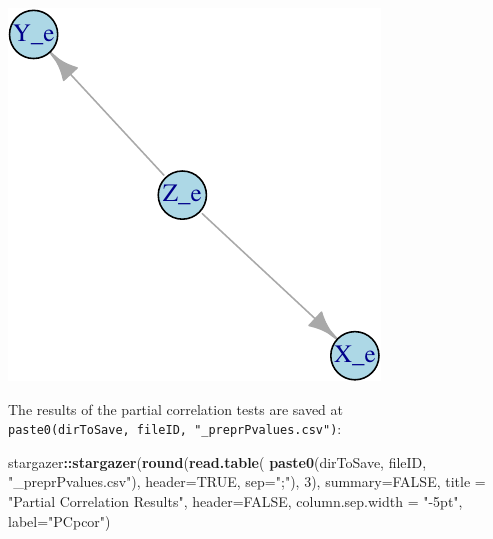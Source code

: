\documentclass[]{article}
\newenvironment{Shaded}{\begin{snugshade}}{\end{snugshade}}
\newcommand{\KeywordTok}[1]{\textcolor[rgb]{0.13,0.29,0.53}{\textbf{#1}}}
\newcommand{\DataTypeTok}[1]{\textcolor[rgb]{0.13,0.29,0.53}{#1}}
\newcommand{\DecValTok}[1]{\textcolor[rgb]{0.00,0.00,0.81}{#1}}
\newcommand{\StringTok}[1]{\textcolor[rgb]{0.31,0.60,0.02}{#1}}
\newcommand{\OtherTok}[1]{\textcolor[rgb]{0.56,0.35,0.01}{#1}}
\newcommand{\OperatorTok}[1]{\textcolor[rgb]{0.81,0.36,0.00}{\textbf{#1}}}
\newcommand{\NormalTok}[1]{#1}
\begin{document}
\includegraphics{familybasedpgms-example_files/figure-latex/unnamed-chunk-25-1.pdf}

The results of the partial correlation tests are saved at
\texttt{paste0(dirToSave,\ fileID,\ "\_preprPvalues.csv")}:

\begin{Shaded}
\begin{Highlighting}[]
\NormalTok{stargazer}\OperatorTok{::}\KeywordTok{stargazer}\NormalTok{(}\KeywordTok{round}\NormalTok{(}\KeywordTok{read.table}\NormalTok{(}
  \KeywordTok{paste0}\NormalTok{(dirToSave, fileID, }\StringTok{"_preprPvalues.csv"}\NormalTok{), }\DataTypeTok{header=}\OtherTok{TRUE}\NormalTok{, }\DataTypeTok{sep=}\StringTok{";"}\NormalTok{),}
  \DecValTok{3}\NormalTok{), }\DataTypeTok{summary=}\OtherTok{FALSE}\NormalTok{, }\DataTypeTok{title =} \StringTok{"Partial Correlation Results"}\NormalTok{, }\DataTypeTok{header=}\OtherTok{FALSE}\NormalTok{,}
  \DataTypeTok{column.sep.width =} \StringTok{"-5pt"}\NormalTok{, }\DataTypeTok{label=}\StringTok{"PCpcor"}\NormalTok{)}
\end{Highlighting}
\end{Shaded}
\end{document}
